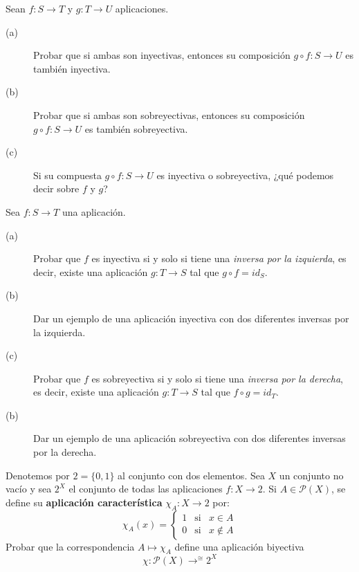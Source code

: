 \begin{ejercicio}
    Sean $f:S\to T$ y $g:T\to U$ aplicaciones.
    \begin{description}
        \item [(a)] Probar que si ambas son inyectivas, entonces su composición $g\circ f:S\to U$ es también inyectiva.
        \item [(b)] Probar que si ambas son sobreyectivas, entonces su composición $g\circ f:S\to U$ es también sobreyectiva.
        \item [(c)] Si su compuesta $g\circ f:S\to U$ es inyectiva o sobreyectiva, ¿qué podemos decir sobre $f$ y $g$?
    \end{description}
\end{ejercicio}

\begin{ejercicio}
    Sea $f:S\to T$ una aplicación.
    \begin{description}
        \item [(a)] Probar que $f$ es inyectiva si y solo si tiene una \emph{inversa por la izquierda}, es decir, existe una aplicación $g:T\to S$ tal que $g\circ f = id_S$.
        \item [(b)] Dar un ejemplo de una aplicación inyectiva con dos diferentes inversas por la izquierda.
        \item [(c)] Probar que $f$ es sobreyectiva si y solo si tiene una \emph{inversa por la derecha}, es decir, existe una aplicación $g:T\to S$ tal que $f\circ g = id_T$.
        \item [(b)] Dar un ejemplo de una aplicación sobreyectiva con dos diferentes inversas por la derecha.
    \end{description}
\end{ejercicio}

\begin{ejercicio}
    Denotemos por $2=\{0,1\}$ al conjunto con dos elementos. Sea $X$ un conjunto no vacío y sea $2^X$ el conjunto de todas las aplicaciones $f:X\to 2$. Si $A\in \mathcal{P}(X)$, se define su \textbf{aplicación característica} $\chi_A:X\to 2$ por:
    \begin{equation*}
        \chi_A(x) = \left\{
            \begin{array}{ccl}
                1 & \text{si} & x\in A \\
                0 & \text{si} & x\notin A
            \end{array}\right.
    \end{equation*}
    Probar que la correspondencia $A\longmapsto \chi_A$ define una aplicación biyectiva
    \begin{equation*}
        \chi:\mathcal{P}(X) \mathop{\longrightarrow}^{\cong}2^X
    \end{equation*}
\end{ejercicio}

